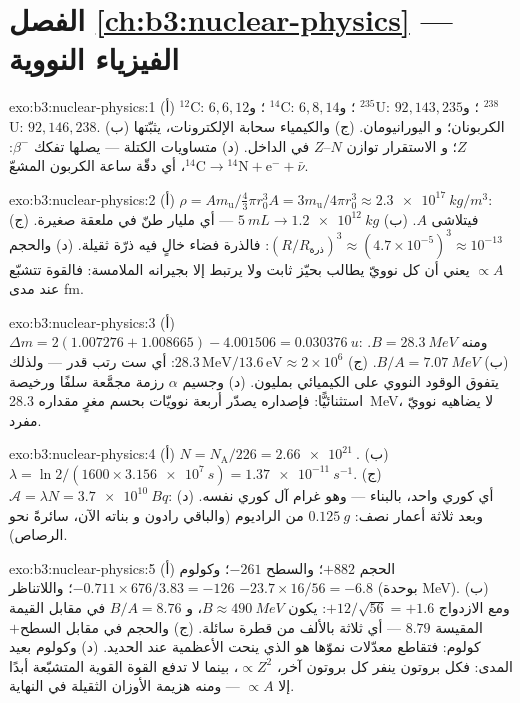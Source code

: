 \section*{الفصل \ref{ch:b3:nuclear-physics} --- الفيزياء النووية}

\begin{solution}{exo:b3:nuclear-physics:1}
(أ) $^{12}$C: $6, 6, 12$؛ و $^{14}$C: $6, 8, 14$؛ و $^{235}$U:
$92, 143, 235$؛ و $^{238}$U: $92, 146, 238$. (ب) الكربونان؛ و
اليورانيومان. (ج) والكيمياء سحابة الإلكترونات، يثبّتها $Z$؛ و
الاستقرار توازن $N$--$Z$ في الداخل. (د) متساويات الكتلة ---
يصلها تفكك $\beta^-$: $^{14}\text{C} \to {}^{14}\text{N}
+ \text{e}^- + \bar\nu$، أي دقّة ساعة الكربون المشعّ.
\end{solution}

\begin{solution}{exo:b3:nuclear-physics:2}
(أ) $\rho = Am_{\text{u}}/\tfrac43\pi r_0^3A =
3m_{\text{u}}/4\pi r_0^3 \approx \qty{2.3e17}{kg/m^3}$: فيتلاشى
$A$. (ب) $\qty{5}{mL} \to \qty{1.2e12}{kg}$ --- أي مليار
طنّ في ملعقة صغيرة. (ج) $(R/R_{\text{ذرة}})^3 \approx
(4.7\times10^{-5})^3 \approx 10^{-13}$: فالذرة فضاء خالٍ
فيه ذرّة ثقيلة. (د) والحجم $\propto A$ يعني أن كل نوويّ
يطالب بحيّز ثابت ولا يرتبط إلا بجيرانه الملامسة: فالقوة
تتشبّع عند مدى \unit{fm}.
\end{solution}

\begin{solution}{exo:b3:nuclear-physics:3}
(أ) $\Delta m = 2(1.007276 + 1.008665) - 4.001506 =
\qty{0.030376}{u}$: ومنه $B = \qty{28.3}{MeV}$. (ب) $B/A =
\qty{7.07}{MeV}$. (ج) $28.3\,\text{MeV}/13.6\,\text{eV} \approx
2\times10^6$: أي ست رتب قدر --- ولذلك يتفوق الوقود النووي
على الكيميائي بمليون. (د) وجسيم $\alpha$ رزمة
مجمَّعة سلفًا ورخيصة استثنائيًّا: فإصداره يصدّر
أربعة نوويّات بحسم مغرٍ مقداره \qty{28.3}{MeV}، لا يضاهيه
نوويّ مفرد.
\end{solution}

\begin{solution}{exo:b3:nuclear-physics:4}
(أ) $N = N_{\text{A}}/226 = \qty{2.66e21}{}$. (ب) $\lambda =
\ln2/(1600\times\qty{3.156e7}{s}) = \qty{1.37e-11}{s^{-1}}$. (ج)
$\mathcal A = \lambda N = \qty{3.7e10}{Bq}$: أي كوري واحد،
بالبناء --- وهو غرام آل كوري نفسه. (د) وبعد ثلاثة أعمار نصف:
$\qty{0.125}{g}$ من الراديوم (والباقي رادون و
بناته الآن، سائرةً نحو الرصاص).
\end{solution}

\begin{solution}{exo:b3:nuclear-physics:5}
(أ) الحجم $+882$؛ والسطح $-261$؛ وكولوم $-0.711\times676/3.83
= -126$؛ واللاتناظر $-23.7\times16/56 = -6.8$ (بوحدة \unit{MeV}). (ب)
ومع الازدواج $+12/\sqrt{56} = +1.6$: يكون $B \approx \qty{490}{MeV}$، و
$B/A = 8.76$ في مقابل القيمة المقيسة $8.79$ --- أي ثلاثة بالألف
من قطرة سائلة. (ج) والحجم في مقابل السطح$+$كولوم: فتقاطع
معدّلات نموّها هو الذي ينحت الأعظمية عند الحديد.
(د) وكولوم بعيد المدى: فكل بروتون ينفر كل بروتون آخر،
$\propto Z^2$، بينما لا تدفع القوة القوية المتشبّعة أبدًا إلا
$\propto A$ --- ومنه هزيمة الأوزان الثقيلة في النهاية.
\end{solution}

